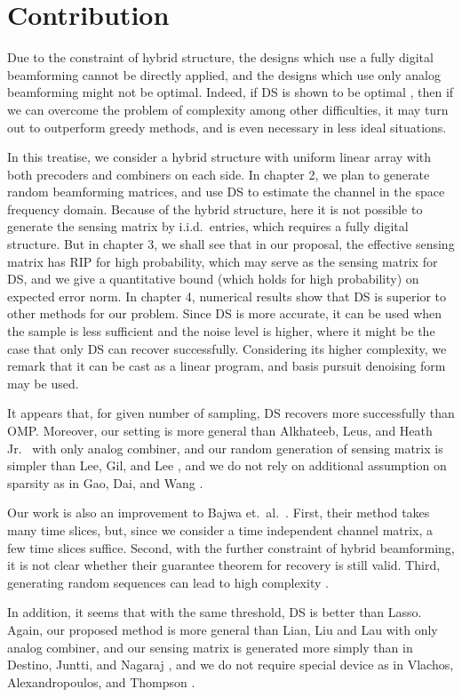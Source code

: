 \section {Contribution}

Due to the constraint of hybrid structure, the designs which use a fully digital beamforming cannot be directly applied, and the designs which use only analog beamforming might not be optimal.
Indeed, if DS is shown to be optimal \cite {CaT07}, then if we can overcome the problem of complexity among other difficulties, it may turn out to outperform greedy methods, and is even necessary in less ideal situations.

In this treatise, we consider a hybrid structure with uniform linear array with both precoders and combiners on each side.
In chapter 2, we plan to generate random beamforming matrices, and use DS to estimate the channel in the space frequency domain.
Because of the hybrid structure, here it is not possible to generate the sensing matrix by i.i.d.\ entries, which requires a fully digital structure.
But in chapter 3, we shall see that in our proposal, the effective sensing matrix has RIP for high probability, which may serve as the sensing matrix for DS,
and we give a quantitative bound (which holds for high probability) on expected error norm.
In chapter 4, numerical results show that DS is superior to other methods for our problem.
Since DS is more accurate, it can be used when the sample is less sufficient and the noise level is higher, where it might be the case that only DS can recover successfully.
Considering its higher complexity, we remark that it can be cast as a linear program, and basis pursuit denoising form may be used.

It appears that, for given number of sampling, DS recovers more successfully than OMP.
Moreover, our setting is more general than Alkhateeb, Leus, and Heath Jr.\ \cite {ALH15} with only analog combiner,
and our random generation of sensing matrix is simpler than Lee, Gil, and Lee \cite {LGL16},
and we do not rely on additional assumption on sparsity as in Gao, Dai, and Wang \cite {GDW15}.

Our work is also an improvement to Bajwa et.\ al.\ \cite {BHS10}.
First, their method takes many time slices, but, since we consider a time independent channel matrix, a few time slices suffice.
Second, with the further constraint of hybrid beamforming, it is not clear whether their guarantee theorem for recovery is still valid.
Third, generating random sequences can lead to high complexity \cite {LGL16}.

In addition, it seems that with the same threshold, DS is better than Lasso.
Again, our proposed method is more general than Lian, Liu and Lau \cite {LLL17} with only analog combiner,
and our sensing matrix is generated more simply than in Destino, Juntti, and Nagaraj \cite {DJN15},
and we do not require special device as in Vlachos, Alexandropoulos, and Thompson \cite {VAT19}.

